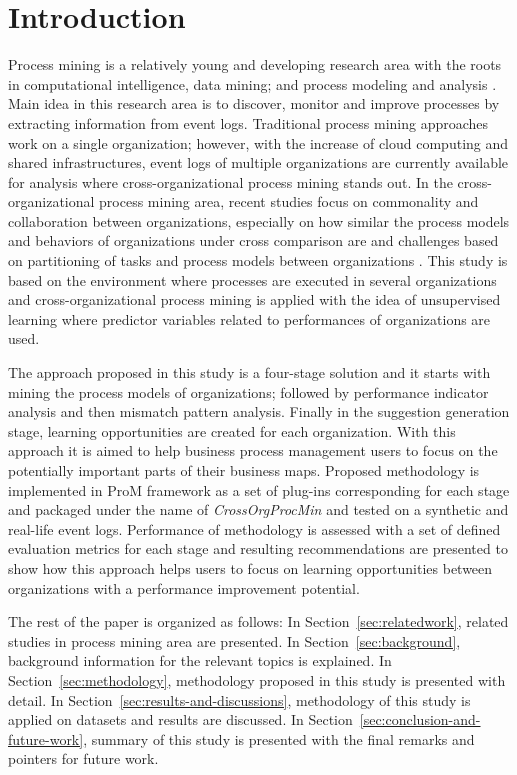 \section{Introduction}
\label{sec:introduction}

Process mining is a relatively young and developing research area with the roots in computational intelligence, data mining; and process modeling and analysis \cite{van2012process}. Main idea in this research area is to discover, monitor and improve processes by extracting information from event logs. Traditional process mining approaches work on a single organization; however, with the increase of cloud computing and shared infrastructures, event logs of multiple organizations are currently available for analysis where cross-organizational process mining stands out. In the cross-organizational process mining area, recent studies focus on commonality and collaboration between organizations, especially on how similar the process models and behaviors of organizations under cross comparison are \cite{buijs2012towards} and challenges based on partitioning of tasks and process models between organizations \cite{van2011intra}. This study is based on the environment where processes are executed in several organizations and cross-organizational process mining is applied with the idea of unsupervised learning where predictor variables related to performances of organizations are used.

The approach proposed in this study is a four-stage solution and it starts with mining the process models of organizations; followed by performance indicator analysis and then mismatch pattern analysis. Finally in the suggestion generation stage, learning opportunities are created for each organization. With this approach it is aimed to help business process management users to focus on the potentially important parts of their business maps. Proposed methodology is implemented in ProM framework \cite{verbeek2010prom} as a set of plug-ins corresponding for each stage and packaged under the name of \textit{CrossOrgProcMin} and tested on a synthetic and real-life event logs. Performance of methodology is assessed with a set of defined evaluation metrics for each stage and resulting recommendations are presented to show how this approach helps users to focus on learning opportunities between organizations with a performance improvement potential.

The rest of the paper is organized as follows: In Section~\ref{sec:relatedwork}, related studies in process mining area are presented. In Section~\ref{sec:background}, background information for the relevant topics is explained. In Section~\ref{sec:methodology}, methodology proposed in this study is presented with detail. In Section~\ref{sec:results-and-discussions}, methodology of this study is applied on datasets and results are discussed. In Section~\ref{sec:conclusion-and-future-work}, summary of this study is presented with the final remarks and pointers for future work. 